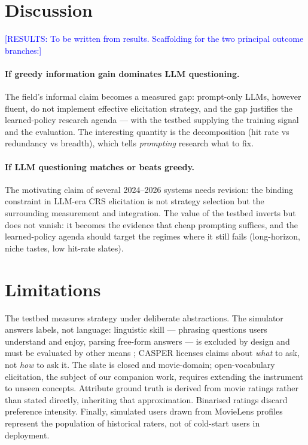 \documentclass[11pt]{article}
\newcommand{\results}[1]{\textcolor{blue}{[RESULTS: #1]}}
\begin{document}
\section{Discussion}
\label{sec:discussion}

\results{To be written from results. Scaffolding for the two principal
outcome branches:}

\paragraph{If greedy information gain dominates LLM questioning.} The
field's informal claim becomes a measured gap: prompt-only LLMs, however
fluent, do not implement effective elicitation strategy, and the gap
justifies the learned-policy research agenda --- with the testbed supplying
the training signal and the evaluation. The interesting quantity is the
decomposition (hit rate vs redundancy vs breadth), which tells
\emph{prompting} research what to fix.

\paragraph{If LLM questioning matches or beats greedy.} The motivating
claim of several 2024--2026 systems needs revision: the binding constraint
in LLM-era CRS elicitation is not strategy selection but the surrounding
measurement and integration. The value of the testbed inverts but does not
vanish: it becomes the evidence that cheap prompting suffices, and the
learned-policy agenda should target the regimes where it still fails
(long-horizon, niche tastes, low hit-rate slates).

\section{Limitations}
\label{sec:limitations}

The testbed measures strategy under deliberate abstractions. The simulator
answers labels, not language: linguistic skill --- phrasing questions users
understand and enjoy, parsing free-form answers --- is excluded by design
and must be evaluated by other means \citep{kostric2025should}; CASPER
licenses claims about \emph{what} to ask, not \emph{how} to ask it. The
slate is closed and movie-domain; open-vocabulary elicitation, the subject
of our companion work, requires extending the instrument to unseen
concepts. Attribute ground truth is derived from movie ratings rather than
stated directly, inheriting that approximation. Binarised ratings discard
preference intensity. Finally, simulated users drawn from MovieLens
profiles represent the population of historical raters, not of
cold-start users in deployment.
\end{document}
